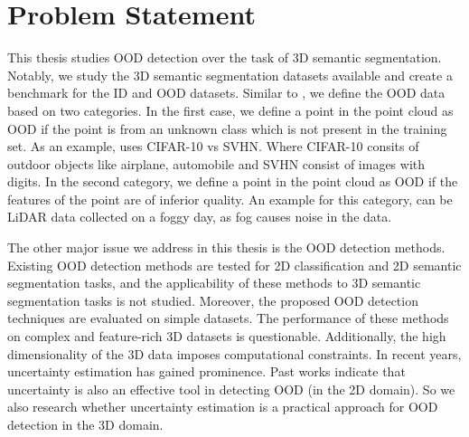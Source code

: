 \section{Problem Statement}
This thesis studies OOD detection over the task of 3D semantic segmentation.
Notably, we study the 3D semantic segmentation datasets available and create a benchmark for the ID and OOD datasets.
Similar to \cite{Cao}, we define the OOD data based on two categories.
In the first case, we define a point in the point cloud as OOD if the point is from an unknown class which is not present in the training set.
As an example, \cite{liang2017enhancing_ODIN} uses CIFAR-10 vs SVHN. Where CIFAR-10 consits of outdoor objects like airplane, automobile and SVHN consist of images with digits.
In the second category, we define a point in the point cloud as OOD if the features of the point are of inferior quality.
An example for this category, can be LiDAR data collected on a foggy day, as fog causes noise in the data.


The other major issue we address in this thesis is the OOD detection methods. 
Existing OOD detection methods are tested for 2D classification and 2D semantic segmentation tasks, and the applicability of
these methods to 3D semantic segmentation tasks is not studied. Moreover, the proposed OOD detection
techniques are evaluated on simple datasets. The performance of these methods on complex and
feature-rich 3D datasets is questionable. Additionally, the high dimensionality of the 3D data imposes computational constraints. In recent years, uncertainty estimation has gained prominence. Past works
indicate that uncertainty is also an effective tool in detecting OOD (in the 2D domain). So we also research
whether uncertainty estimation is a practical approach for OOD detection in the 3D domain.
% 

